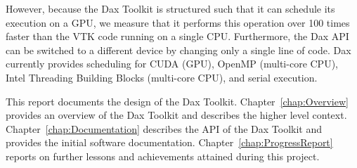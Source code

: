 However, because the Dax Toolkit is structured such that it can schedule
its execution on a GPU, we measure that it performs this operation over 100
times faster than the VTK code running on a single CPU. Furthermore, the
Dax API can be switched to a different device by changing only a single
line of code. Dax currently provides scheduling for CUDA (GPU), OpenMP
(multi-core CPU), Intel Threading Building Blocks (multi-core CPU), and
serial execution.

This report documents the design of the Dax
Toolkit. Chapter~\ref{chap:Overview} provides an overview of the Dax
Toolkit and describes the higher level
context. Chapter~\ref{chap:Documentation} describes the API of the Dax
Toolkit and provides the initial software
documentation. Chapter~\ref{chap:ProgressReport} reports on further lessons
and achievements attained during this project.
